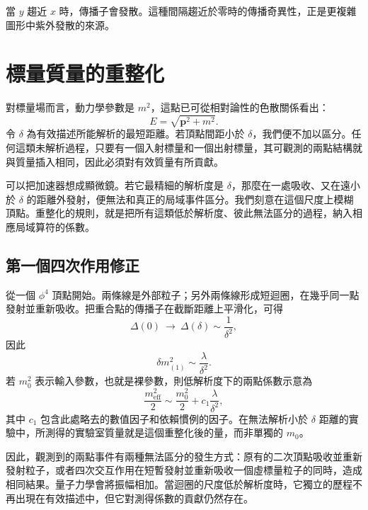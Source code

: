 當 \(y\) 趨近 \(x\) 時，傳播子會發散。這種間隔趨近於零時的傳播奇異性，正是更複雜圖形中紫外發散的來源。

\section{標量質量的重整化}

對標量場而言，動力學參數是 \(m^2\)，這點已可從相對論性的色散關係看出：
\begin{equation}
E=\sqrt{\mathbf p^2+m^2}.
\end{equation}
令 \(\delta\) 為有效描述所能解析的最短距離。若頂點間距小於 \(\delta\)，我們便不加以區分。任何這類未解析過程，只要有一個入射標量和一個出射標量，其可觀測的兩點結構就與質量插入相同，因此必須對有效質量有所貢獻。

可以把加速器想成顯微鏡。若它最精細的解析度是 \(\delta\)，那麼在一處吸收、又在遠小於 \(\delta\) 的距離外發射，便無法和真正的局域事件區分。我們刻意在這個尺度上模糊頂點。重整化的規則，就是把所有這類低於解析度、彼此無法區分的過程，納入相應局域算符的係數。

\subsection{第一個四次作用修正}

從一個 \(\phi^4\) 頂點開始。兩條線是外部粒子；另外兩條線形成短迴圈，在幾乎同一點發射並重新吸收。把重合點的傳播子在截斷距離上平滑化，可得
\begin{equation}
\Delta(0)\ \longrightarrow\ \Delta(\delta)\sim\frac{1}{\delta^2},
\end{equation}
因此
\begin{equation}
\delta m^2_{(1)}\sim\frac{\lambda}{\delta^2}.
\label{eq:one-loop-scalar-mass}
\end{equation}
若 \(m_0^2\) 表示輸入參數，也就是裸參數，則低解析度下的兩點係數示意為
\begin{equation}
\frac{m_{\mathrm{eff}}^2}{2}
\sim
\frac{m_0^2}{2}
+c_1\frac{\lambda}{\delta^2},
\label{eq:first-renormalized-mass}
\end{equation}
其中 \(c_1\) 包含此處略去的數值因子和依賴慣例的因子。在無法解析小於 \(\delta\) 距離的實驗中，所測得的實驗室質量就是這個重整化後的量，而非單獨的 \(m_0\)。

因此，觀測到的兩點事件有兩種無法區分的發生方式：原有的二次頂點吸收並重新發射粒子，或者四次交互作用在短暫發射並重新吸收一個虛標量粒子的同時，造成相同結果。量子力學會將振幅相加。當迴圈的尺度低於解析度時，它獨立的歷程不再出現在有效描述中，但它對測得係數的貢獻仍然存在。

